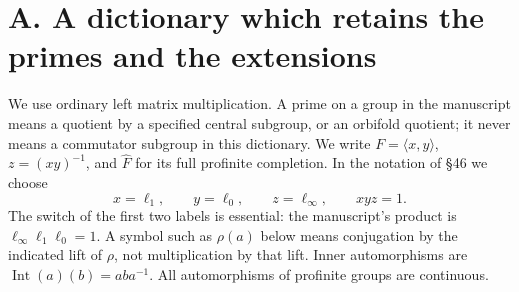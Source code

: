 \section{A. A dictionary which retains the primes and the extensions}
\label{sec:dictionary}

We use ordinary left matrix multiplication. A prime on a group in the manuscript means a quotient by a specified central subgroup, or an orbifold quotient; it never means a commutator subgroup in this dictionary. We write $F=\langle x,y\rangle$, $z=(xy)^{-1}$, and $\widehat F$ for its full profinite completion. In the notation of \S46 we choose
\[
 x=\ell _1,\qquad y=\ell _0,\qquad z=\ell _\infty,
 \qquad xyz=1.
\]
The switch of the first two labels is essential: the manuscript's product is $\ell _\infty\ell _1\ell _0=1$. A symbol such as $\rho(a)$ below means conjugation by the indicated lift of $\rho$, not multiplication by that lift. Inner automorphisms are $\operatorname{Int}(a)(b)=aba^{-1}$. All automorphisms of profinite groups are continuous.

